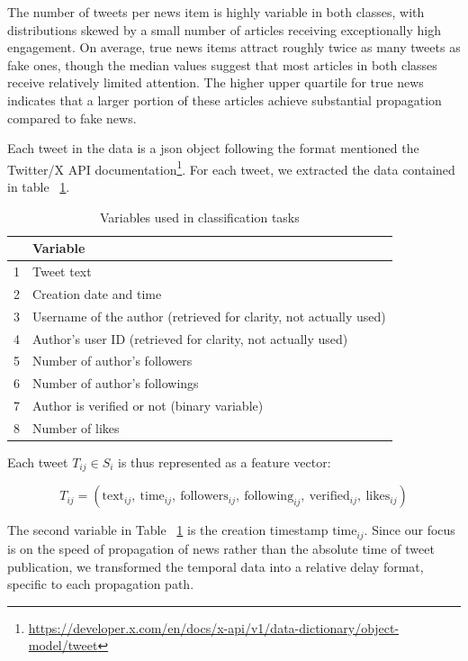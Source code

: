 \documentclass[a4paper,twoside,12pt]{book}
\begin{document}
The number of tweets per news item is highly variable in both classes, with distributions skewed by a small number of articles receiving exceptionally high engagement. On average, true news items attract roughly twice as many tweets as fake ones, though the median values suggest that most articles in both classes receive relatively limited attention. The higher upper quartile for true news indicates that a larger portion of these articles achieve substantial propagation compared to fake news.

Each tweet in the data is a json object following the format mentioned the Twitter/X API documentation\footnote{\url{https://developer.x.com/en/docs/x-api/v1/data-dictionary/object-model/tweet}}. For each tweet, we extracted the data contained in table ~\ref{tab:variables_net}. 

\vspace{2em}

\begin{table}[h!]
	\centering
	\begin{tabular}{cl}
		\hline
		 & \textbf{Variable} \\ \hline
		1 & Tweet text \\
		2 & Creation date and time \\
		3 & Username of the author (retrieved for clarity, not actually used) \\
		4 & Author's user ID (retrieved for clarity, not actually used) \\
		5 & Number of author's followers \\
		6 & Number of author's followings \\
		7 & Author is verified or not (binary variable) \\
		8 & Number of likes \\ \hline
	\end{tabular}
	\vspace{1em}
	\caption{Variables used in classification tasks} \label{tab:variables_net}
\end{table}

Each tweet $T_{ij} \in S_i$ is thus represented as a feature vector:

$$
T_{ij} = \left( \text{text}_{ij},\ \text{time}_{ij},\ \text{followers}_{ij},\ \text{following}_{ij},\ \text{verified}_{ij},\ \text{likes}_{ij} \right)
$$

The second variable in Table ~\ref{tab:variables_net} is the creation timestamp $\text{time}_{ij}$. Since our focus is on the speed of propagation of news rather than the absolute time of tweet publication, we transformed the temporal data into a relative delay format, specific to each propagation path.
\end{document}
